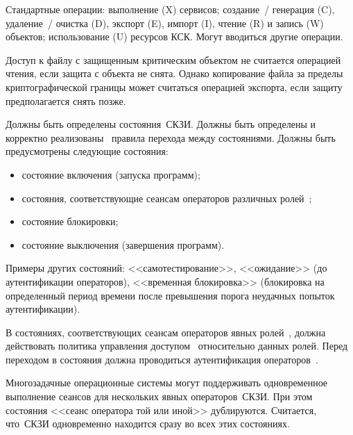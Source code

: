 \begin{note}
Стандартные операции: 
выполнение (X) сервисов; 
создание~/ генерация (C), удаление~/ очистка (D), экспорт (E), импорт (I), 
чтение (R) и запись (W) объектов; 
использование (U) ресурсов КСК.
%
Могут вводиться другие операции.
\end{note}

\begin{note}
Доступ к файлу с защищенным критическим объектом не считается операцией 
чтения, если защита с объекта не снята. Однако копирование файла за пределы 
криптографической границы может считаться операцией экспорта, если защиту 
предполагается снять позже.
\end{note}

\label{R.AC.States} %
Должны быть определены состояния~СКЗИ. Должны быть определены и 
корректно реализованы~ правила 
перехода между состояниями. Должны быть предусмотрены следующие состояния:
\begin{itemize}
\item
состояние включения (запуска программ);
\item
состояния, соответствующие сеансам операторов различных ролей~;
\item
состояние блокировки;
\item
состояние выключения (завершения программ).
\end{itemize}

\begin{note}
Примеры других состояний:
<<самотестирование>>,
<<ожидание>> (до аутентификации операторов),
<<временная блокировка>> (блокировка на определенный период времени
после превышения порога неудачных попыток аутентификации).
\end{note}

\label{R.AC.OpStates} %
В состояниях, соответствующих сеансам операторов явных
ролей~, должна действовать политика управления 
доступом~ относительно данных ролей.
%
Перед переходом в состояния должна проводиться аутентификация
операторов~.

\begin{note}
Многозадачные операционные системы могут поддерживать 
одновременное выполнение сеансов для нескольких явных операторов~СКЗИ.
При этом состояния <<сеанс оператора той или иной>> дублируются. 
Считается, что~СКЗИ одновременно находится сразу во всех этих состояниях. 

\end{note}

